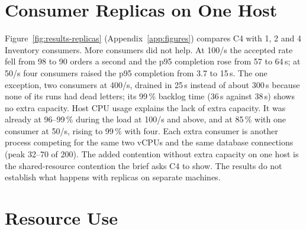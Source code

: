 \documentclass[a4paper]{report}
\begin{document}
\begin{table}[tbp]
\centering
\footnotesize
{}
\caption{Backlog per cell (C2 to C4). Peak queue is the largest depth of the
\texttt{OrderPlaced} queue (ready plus unacknowledged). Oldest is the age of
its oldest message (s). Outbox peak is the largest number of unpublished
Outbox rows, summed over Order Service and every Inventory replica. Drain is
the matrix's drain time (s). Cells: median of 3 runs (range).}
\label{tab:results-overload}
\end{table}

\begin{table}[tbp]
\centering
\footnotesize
{}
\caption{What the reliability mechanisms did, as totals per run. Retries and
duplicates are attempts absorbed by the Inbox, not business effects.
Dead-lettered messages all came from the Process Worker (its own counter shows
the same numbers). Reconciliation counts re-triggers and give-ups of the
reconciliation job. Cells: median of 3 runs (range).}
\label{tab:results-reliability}
\end{table}

\section{Consumer Replicas on One Host}

Figure~\ref{fig:results-replicas} (Appendix~\ref{app:figures}) compares C4 with 1, 2 and 4 Inventory
consumers. More consumers did not help. At 100/s the accepted rate fell from
98 to 90 orders a second and the p95 completion rose from 57 to 64\,s; at 50/s
four consumers raised the p95 completion from 3.7 to 15\,s. The one exception,
two consumers at 400/s, drained in 25\,s instead of about 300\,s because none
of its runs had dead letters; its 99\,\% backlog time (36\,s against 38\,s)
shows no extra capacity. Host CPU usage explains the lack of extra capacity.
It was already at 96--99\,\% during the load at 100/s and above, and at 85\,\%
with one consumer at 50/s, rising to 99\,\% with four. Each extra consumer is
another process competing for the same two vCPUs and the same database
connections (peak 32--70 of 200). The added contention without extra capacity
on one host is the shared-resource contention the brief asks C4 to show. The results do not
establish what happens with replicas on separate machines.

\section{Resource Use}
\end{document}
